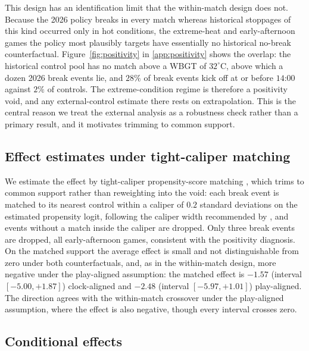 \documentclass[11pt]{article}
\begin{document}
This design has an identification limit that the within-match design does not. Because the 2026 policy breaks
in every match whereas historical stoppages of this kind occurred only in hot conditions, the extreme-heat and
early-afternoon games the policy most plausibly targets have essentially no historical no-break counterfactual.
Figure~\ref{fig:positivity} in \ref{app:positivity} shows the overlap: the historical control pool
has no match above a WBGT of $32^\circ$C, above which a dozen 2026 break events lie, and $28\%$ of break events
kick off at or before $14$:$00$ against $2\%$ of controls. The extreme-condition regime is therefore a
positivity void, and any external-control estimate there rests on extrapolation. This is the central reason we
treat the external analysis as a robustness check rather than a primary result, and it motivates trimming to
common support.

\subsection{Effect estimates under tight-caliper matching}
\label{sec:matching}

We estimate the effect by tight-caliper propensity-score matching \citep{rosenbaum1983propensity,stuart2010matching},
which trims to common support rather than reweighting into the void: each break event is matched to its nearest
control within a caliper of $0.2$ standard deviations on the estimated propensity logit, following the caliper
width recommended by \citet{austin2011caliper}, and events without a match inside the caliper are dropped. Only three break events are dropped, all early-afternoon games, consistent with the positivity
diagnosis. On the matched support the average effect is small and not distinguishable from zero under both counterfactuals, and, as in the
within-match design, more negative under the play-aligned assumption: the matched effect is $-1.57$ (interval
$[-5.00,+1.87]$) clock-aligned and $-2.48$ (interval $[-5.97,+1.01]$) play-aligned. The direction agrees with
the within-match crossover under the play-aligned assumption, where the effect is also negative, though every
interval crosses zero.

\subsection{Conditional effects}
\label{sec:ext-cate}
\end{document}
